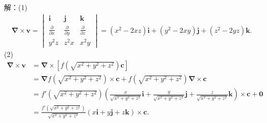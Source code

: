 \documentclass[12pt,UTF8]{ctexart}
\newcommand{\pp}[2]{\frac{\partial #1}{\partial #2}}
\begin{document}
\begin{enumerate}
解：(1)\[\begin{split}
\bm\nabla\times\bm v=\begin{vmatrix}
\bm i&\bm j&\bm k\\
\pp{}x&\pp{}y&\pp{}z\\
y^2z&z^2x&x^2y
\end{vmatrix}=(x^2-2xz)\bm i+(y^2-2xy)\bm j+(z^2-2yz)\bm k.
\end{split}\]
(2)\[\begin{split}
\bm\nabla\times\bm v&=\bm\nabla\times[f(\sqrt{x^2+y^2+z^2})\bm c]\\
&=\bm\nabla f(\sqrt{x^2+y^2+z^2})\times\bm c+f(\sqrt{x^2+y^2+z^2})\bm\nabla\times\bm c\\
&=f'(\sqrt{x^2+y^2+z^2})(\frac x{\sqrt{x^2+y^2+z^2}}\bm i+\frac y{\sqrt{x^2+y^2+z^2}}\bm j+\frac z{\sqrt{x^2+y^2+z^2}}\bm k)\times\bm c+\bm0\\
&=\frac{f'(\sqrt{x^2+y^2+z^2})}{\sqrt{x^2+y^2+z^2}}(x\bm i+y\bm j+z\bm k)\times\bm c.
\end{split}\]
\end{enumerate}
\end{document}

